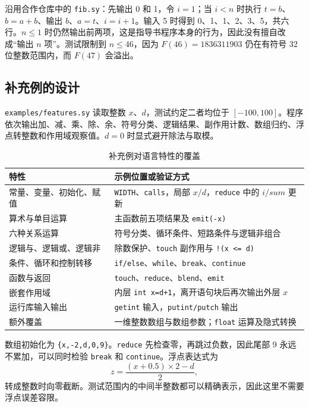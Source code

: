 \documentclass[UTF8,a4paper,10pt]{ctexart}
\begin{document}
沿用合作仓库中的 \texttt{fib.sy}：先输出 0 和 1，令 $i=1$；当 $i<n$ 时执行
$t=b$、$b=a+b$、输出 $b$、$a=t$、$i=i+1$。输入 5 时得到 0、1、1、2、3、5，共六行。$n\leq 1$ 时仍然输出前两项，这是指导书程序本身的行为，因此没有擅自改成“输出 $n$ 项”。测试限制到 $n\leq 46$，因为 $F(46)=1836311903$ 仍在有符号 32 位整数范围内，而 $F(47)$ 会溢出。

\subsection{补充例的设计}

\texttt{examples/features.sy} 读取整数 $x$、$d$，测试约定二者均位于 $[-100,100]$。程序依次输出加、减、乘、除、余、符号分类、逻辑结果、副作用计数、数组归约、浮点转整数和作用域观察值。$d=0$ 时显式避开除法与取模。

\begin{table}[H]
  \centering
  \caption{补充例对语言特性的覆盖}
  \begin{tabularx}{\textwidth}{p{4.0cm}Y}
    \toprule
    特性 & 示例位置或验证方式 \\
    \midrule
    常量、变量、初始化、赋值 & \texttt{WIDTH}、\texttt{calls}，局部 $x/d$，\texttt{reduce} 中的 $i/sum$ 更新 \\
    算术与单目运算 & 主函数前五项结果及 \texttt{emit(-x)} \\
    六种关系运算 & 符号分类、循环条件、短路条件与逻辑非组合 \\
    逻辑与、逻辑或、逻辑非 & 除数保护、\texttt{touch} 副作用与 \texttt{!(x <= d)} \\
    条件、循环和控制转移 & \texttt{if/else}、\texttt{while}、\texttt{break}、\texttt{continue} \\
    函数与返回 & \texttt{touch}、\texttt{reduce}、\texttt{blend}、\texttt{emit} \\
    嵌套作用域 & 内层 \texttt{int x=d+1}，离开语句块后再次输出外层 $x$ \\
    运行库输入输出 & \texttt{getint} 输入，\texttt{putint/putch} 输出 \\
    额外覆盖 & 一维整数数组与数组参数；\texttt{float} 运算及隐式转换 \\
    \bottomrule
  \end{tabularx}
\end{table}

数组初始化为 \texttt{\{x,-2,d,0,9\}}。\texttt{reduce} 先检查零，再跳过负数，因此尾部 9 永远不累加，可以同时检验 \texttt{break} 和 \texttt{continue}。浮点表达式为
\[
z=\frac{(x+0.5)\times 2-d}{2},
\]
转成整数时向零截断。测试范围内的中间半整数都可以精确表示，因此这里不需要浮点误差容限。
\end{document}
